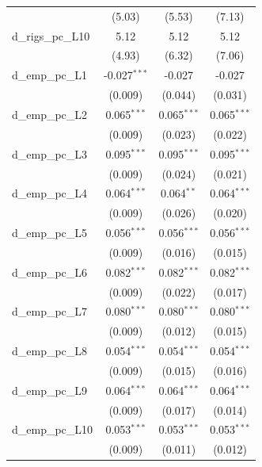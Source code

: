 \begin{tabular}{lccc}
                       & (5.03)         & (5.53)         & (7.13)\\   
   d\_rigs\_pc\_L10    & 5.12           & 5.12           & 5.12\\   
                       & (4.93)         & (6.32)         & (7.06)\\   
   d\_emp\_pc\_L1      & -0.027$^{***}$ & -0.027         & -0.027\\   
                       & (0.009)        & (0.044)        & (0.031)\\   
   d\_emp\_pc\_L2      & 0.065$^{***}$  & 0.065$^{***}$  & 0.065$^{***}$\\   
                       & (0.009)        & (0.023)        & (0.022)\\   
   d\_emp\_pc\_L3      & 0.095$^{***}$  & 0.095$^{***}$  & 0.095$^{***}$\\   
                       & (0.009)        & (0.024)        & (0.021)\\   
   d\_emp\_pc\_L4      & 0.064$^{***}$  & 0.064$^{**}$   & 0.064$^{***}$\\   
                       & (0.009)        & (0.026)        & (0.020)\\   
   d\_emp\_pc\_L5      & 0.056$^{***}$  & 0.056$^{***}$  & 0.056$^{***}$\\   
                       & (0.009)        & (0.016)        & (0.015)\\   
   d\_emp\_pc\_L6      & 0.082$^{***}$  & 0.082$^{***}$  & 0.082$^{***}$\\   
                       & (0.009)        & (0.022)        & (0.017)\\   
   d\_emp\_pc\_L7      & 0.080$^{***}$  & 0.080$^{***}$  & 0.080$^{***}$\\   
                       & (0.009)        & (0.012)        & (0.015)\\   
   d\_emp\_pc\_L8      & 0.054$^{***}$  & 0.054$^{***}$  & 0.054$^{***}$\\   
                       & (0.009)        & (0.015)        & (0.016)\\   
   d\_emp\_pc\_L9      & 0.064$^{***}$  & 0.064$^{***}$  & 0.064$^{***}$\\   
                       & (0.009)        & (0.017)        & (0.014)\\   
   d\_emp\_pc\_L10     & 0.053$^{***}$  & 0.053$^{***}$  & 0.053$^{***}$\\   
                       & (0.009)        & (0.011)        & (0.012)\\   

\end{tabular}

